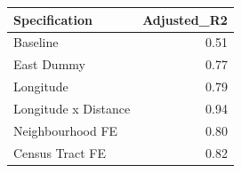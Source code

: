 \begin{tabular}{lr}
  \hline
Specification & Adjusted\_R2 \\ 
  \hline
Baseline & 0.51 \\ 
  East Dummy & 0.77 \\ 
  Longitude  & 0.79 \\ 
  Longitude x Distance & 0.94 \\ 
  Neighbourhood FE & 0.80 \\ 
  Census Tract FE & 0.82 \\ 
   \hline
\end{tabular}
